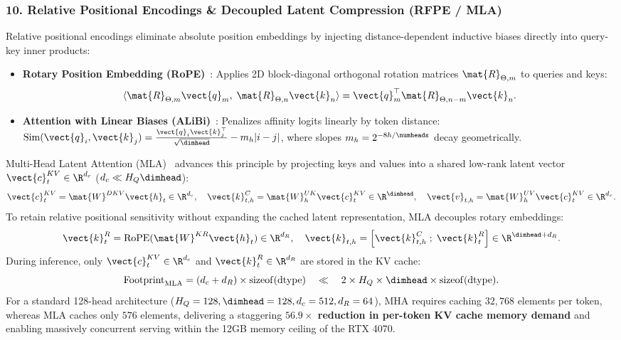\subsubsection{10. Relative Positional Encodings \& Decoupled Latent Compression (RFPE / MLA)}
\label{subsubsec:rfpe_mla_contract}
Relative positional encodings eliminate absolute position embeddings by injecting distance-dependent inductive biases directly into query-key inner products:
\begin{itemize}
\item \textbf{Rotary Position Embedding (RoPE)}~\cite{su2024roformer}: Applies 2D block-diagonal orthogonal rotation matrices $\mat{R}_{\Theta, m}$ to queries and keys:
\begin{equation}
\langle \mat{R}_{\Theta, m} \vect{q}_m, \; \mat{R}_{\Theta, n} \vect{k}_n \rangle = \vect{q}_m^\top \mat{R}_{\Theta, n-m} \vect{k}_n.
\end{equation}
\item \textbf{Attention with Linear Biases (ALiBi)}~\cite{press2022alibi}: Penalizes affinity logits linearly by token distance: $\operatorname{Sim}(\vect{q}_i, \vect{k}_j) = \frac{\vect{q}_i \vect{k}_j^\top}{\sqrt{\dimhead}} - m_h |i - j|$, where slopes $m_h = 2^{-8h/\numheads}$ decay geometrically.
\end{itemize}

Multi-Head Latent Attention (MLA)~\cite{deepseek2024mla} advances this principle by projecting keys and values into a shared low-rank latent vector $\vect{c}_t^{KV} \in \R^{d_c}$ ($d_c \ll H_Q \dimhead$):
\begin{equation}
\vect{c}_t^{KV} = \mat{W}^{DKV} \vect{h}_t \in \R^{d_c}, \quad \vect{k}_{t, h}^C = \mat{W}_h^{UK} \vect{c}_t^{KV} \in \R^{\dimhead}, \quad \vect{v}_{t, h} = \mat{W}_h^{UV} \vect{c}_t^{KV} \in \R^{d_v}.
\end{equation}
To retain relative positional sensitivity without expanding the cached latent representation, MLA decouples rotary embeddings:
\begin{equation}
\vect{k}_t^R = \operatorname{RoPE}(\mat{W}^{KR} \vect{h}_t) \in \R^{d_R}, \quad \vect{k}_{t, h} = \left[ \vect{k}_{t, h}^C \;;\; \vect{k}_t^R \right] \in \R^{\dimhead + d_R}.
\end{equation}
During inference, only $\vect{c}_t^{KV} \in \R^{d_c}$ and $\vect{k}_t^R \in \R^{d_R}$ are stored in the KV cache:
\begin{equation}
\operatorname{Footprint}_{\text{MLA}} = (d_c + d_R) \times \operatorname{sizeof}(\text{dtype}) \quad \ll \quad 2 \times H_Q \times \dimhead \times \operatorname{sizeof}(\text{dtype}).
\end{equation}
For a standard 128-head architecture ($H_Q=128, \dimhead=128, d_c=512, d_R=64$), MHA requires caching $32{,}768$ elements per token, whereas MLA caches only $576$ elements, delivering a staggering \textbf{$56.9\times$ reduction in per-token KV cache memory demand} and enabling massively concurrent serving within the 12GB memory ceiling of the RTX 4070.

